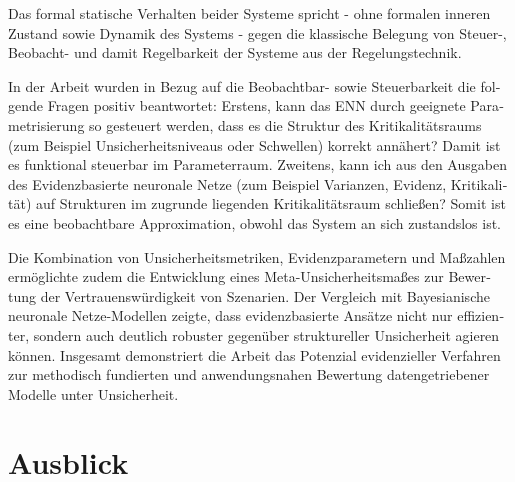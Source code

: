 \begin{otherlanguage}{ngerman}
Das formal statische Verhalten beider Systeme spricht - ohne formalen inneren Zustand sowie Dynamik des Systems - gegen die klassische Belegung von Steuer-, Beobacht- und damit Regelbarkeit der Systeme aus der Regelungstechnik.

In der Arbeit wurden in Bezug auf die Beobachtbar- sowie Steuerbarkeit die folgende Fragen positiv beantwortet: Erstens, kann das ENN durch geeignete Parametrisierung so gesteuert werden, dass es die Struktur des Kritikalitätsraums (zum Beispiel Unsicherheitsniveaus oder Schwellen) korrekt annähert? Damit ist es funktional steuerbar im Parameterraum. Zweitens, kann ich aus den Ausgaben des \gls{Evidenzbasierte neuronale Netze} (zum Beispiel Varianzen, Evidenz, Kritikalität) auf Strukturen im zugrunde liegenden Kritikalitätsraum schließen? Somit ist es eine beobachtbare Approximation, obwohl das System an sich zustandslos ist.

Die Kombination von Unsicherheitsmetriken, Evidenzparametern und Maßzahlen ermöglichte zudem die Entwicklung eines Meta-Unsicherheitsmaßes zur Bewertung der Vertrauenswürdigkeit von Szenarien. Der Vergleich mit \gls{Bayesianische neuronale Netze}-Modellen zeigte, dass evidenzbasierte Ansätze nicht nur effizienter, sondern auch deutlich robuster gegenüber struktureller Unsicherheit agieren können. Insgesamt demonstriert die Arbeit das Potenzial evidenzieller Verfahren zur methodisch fundierten und anwendungsnahen Bewertung datengetriebener Modelle unter Unsicherheit.



\section{Ausblick}


\end{otherlanguage}

